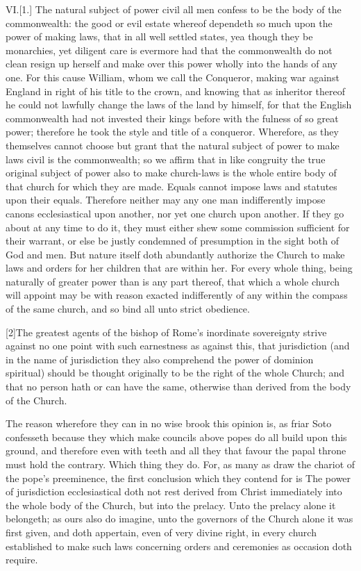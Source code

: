 VI.[1.] The natural subject of power civil all men confess to be the body of the commonwealth: the good or evil estate whereof dependeth so much upon the power of making laws, that in all well settled states, yea though they be monarchies, yet diligent care is evermore had that the commonwealth do not clean resign up herself and make over this power wholly into the hands of any one.
For this cause William, whom we call the Conqueror, making war against England in right of his title to the crown, and knowing that as inheritor thereof he could not lawfully change the laws of the land by himself, for that the English commonwealth had not invested their kings before with the fulness of so great power; therefore he took the style and title of a conqueror. Wherefore, as they themselves cannot choose but grant that the natural subject of power to make laws civil is the commonwealth; so we affirm that in like congruity the true original subject of power also to make church-laws is the whole entire body of that church for which they are made. Equals cannot impose laws and statutes upon their equals. Therefore neither may any one man indifferently impose canons ecclesiastical upon another, nor yet one church upon another. If they go about at any time to do it, they must either shew some commission sufficient for their warrant, or else be justly condemned of presumption in the sight both of God and men. But nature itself doth abundantly authorize the Church to make laws and orders for her children that are within her. For every whole thing, being naturally of greater power than is any part thereof, that which a whole church will appoint may be with reason exacted indifferently of any within the compass of the same church, and so bind all unto strict obedience.

[2]The greatest agents of the bishop of Rome’s inordinate sovereignty strive against no one point with such earnestness as against this, that jurisdiction (and in the name of jurisdiction they also comprehend the power of dominion spiritual)  should be thought originally to be the right of the whole Church; and that no person hath or can have the same, otherwise than derived from the body of the Church.

The reason wherefore they can in no wise brook this opinion is, as friar Soto confesseth because they which make councils above popes do all build upon this ground, and therefore even with teeth and all they that favour the papal throne must hold the contrary. Which thing they do. For, as many as draw the chariot of the pope’s preeminence, the first conclusion which they contend for is The power of jurisdiction ecclesiastical doth not rest derived from Christ immediately into the whole body of the Church, but into the prelacy. Unto the prelacy alone it belongeth; as ours also do imagine, unto the governors of the Church alone it was first given, and doth appertain, even of very divine right, in every church established to make such laws concerning orders and ceremonies as occasion doth require.

